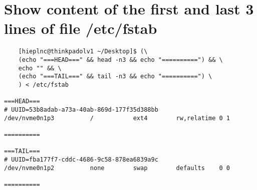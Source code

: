 \documentclass{article}
\begin{document}
	\section{Show content of the first and last 3 lines of file /etc/fstab}
	\begin{verbatim}
	[hieplnc@thinkpadolv1 ~/Desktop]$ (\
	(echo "===HEAD===" && head -n3 && echo "==========") && \
	echo "" && \
	(echo "===TAIL===" && tail -n3 && echo "==========") \
	) < /etc/fstab

===HEAD===
# UUID=53b8adab-a73a-40ab-869d-177f35d388bb
/dev/nvme0n1p3      	/         	ext4      	rw,relatime	0 1

==========

===TAIL===
# UUID=fba177f7-cddc-4686-9c58-878ea6839a9c
/dev/nvme0n1p2      	none      	swap      	defaults  	0 0

==========
	\end{verbatim}
\end{document}
